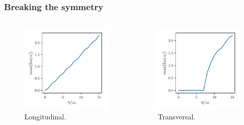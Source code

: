 \documentclass[pdflatex,compress]{beamer}
\begin{document}
\begin{frame}
\frametitle{Breaking the symmetry}
\begin{columns}
\begin{figure}
\centering
\includegraphics[width=1\textwidth]{images/theta_long.pdf}
\vspace*{-10mm}
\caption{Longitudinal.}
\end{figure}
\begin{figure}
\centering
\includegraphics[width=1\textwidth]{images/theta_trans.pdf}
\vspace*{-10mm}
\caption{Transversal.}
\end{figure}
\end{columns}
\end{frame}
\end{document}

